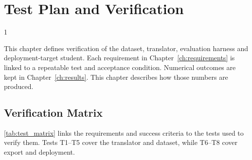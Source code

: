 \doublespacing %

\chapter{Test Plan and Verification}
\label{ch:testplan}

\begin{spacing}{1} %
\minitoc %
\end{spacing} %
\thesisspacing %

This chapter defines verification of the dataset, translator, evaluation harness and deployment-target student. Each requirement in Chapter~\ref{ch:requirements} is linked to a repeatable test and acceptance condition. Numerical outcomes are kept in Chapter~\ref{ch:results}. This chapter describes how those numbers are produced.

\section{Verification Matrix}
\label{sec:test_matrix}

\autoref{tab:test_matrix} links the requirements and success criteria to the tests used to verify them. Tests T1--T5 cover the translator and dataset, while T6--T8 cover export and deployment.

